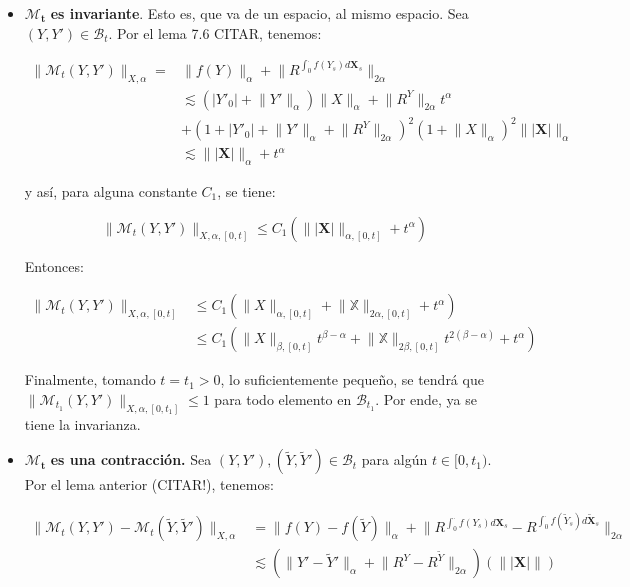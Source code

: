 \begin{itemize}
	\item $\mathbf{ \mathcal{M}_t }$ \textbf{es invariante}. Esto es, que va de un espacio, al mismo espacio. Sea $(Y, Y') \in \mathcal{B}_t$. Por el lema 7.6 CITAR, tenemos:

	\begin{align*}
		\lVert \mathcal{M}_t (Y, Y') \rVert_{X, \alpha} =& \lVert f(Y) \rVert_{\alpha} + \lVert R^{\int_0^{\cdot} f(Y_s) d\mathbf{X}_s }  \rVert_{2\alpha} \\
		&\lesssim ( \lvert Y'_0 \rvert + \lVert Y' \rVert_{\alpha}  )\lVert X \rVert_{\alpha} + \lVert R^Y \rVert_{2\alpha} t^{\alpha} \\
		&+ (1 + \lvert Y'_0 \rvert + \lVert Y' \rVert_{\alpha} + 
		 \lVert  R^Y \rVert_{2\alpha})^{2} (1 + \lVert X \rVert_{\alpha})^2 \lVert \lvert \mathbf{X} \rvert \rVert_{\alpha} \\
		&\lesssim  \lVert \lvert \mathbf{X} \rvert \rVert_{\alpha} + t^{\alpha}
	\end{align*}

	y así, para alguna constante $C_1$, se tiene:

	\[
		\lVert \mathcal{M}_t (Y,Y') \rVert_{ X, \alpha, [0,t] } \leq C_1 \left(  \lVert  \lvert \mathbf{X} \rvert  \rVert_{\alpha, [0,t]} + t^{\alpha} \right)
	\]

	Entonces:

	\begin{align*}
		\lVert \mathcal{M}_t (Y,Y') \rVert_{X, \alpha, [0,t]} &\leq  C_1 ( \lVert X \rVert_{\alpha, [0,t]} + \lVert \mathbb{X} \rVert_{2\alpha, [0,t]} + t^{\alpha} ) \\
		&\leq C_1 ( \lVert X \rVert_{\beta, [0,t]} t^{\beta - \alpha} + \lVert \mathbb{X} \rVert_{2 \beta, [0,t]} t^{2 (\beta - \alpha)} + t^{\alpha} )
	\end{align*}

	Finalmente, tomando $t = t_1 > 0$, lo suficientemente pequeño, se tendrá que $\lVert \mathcal{M}_{t_1} (Y, Y') \rVert_{X, \alpha, [0, t_1]} \leq 1$ para todo elemento en $\mathcal{B}_{t_1}$. Por ende, ya se tiene la invarianza.


	\item $\mathbf{\mathcal{M}_t}$ \textbf{es una contracción.} Sea $(Y, Y'), ( \tilde{Y}, \tilde{Y}' ) \in \mathcal{B}_{t}$ para algún $t \in [0,t_1)$. Por el lema anterior (CITAR!), tenemos:

	\begin{align*}
		\lVert  \mathcal{M}_t (Y, Y') - \mathcal{M}_t (\tilde{Y}, \tilde{Y}') \rVert_{X, \alpha} &=  \lVert f(Y) - f(\tilde{Y}) \rVert_{\alpha} + \lVert R^{\int_0^{\cdot} f(Y_s) d\mathbf{X}_s} - R^{\int_0^{\cdot} f( \tilde{Y}_s ) d \mathbf{ \tilde{X} }_s }  \rVert_{2 \alpha} \\
		&\lesssim ( \lVert Y' - \tilde{Y}' \rVert_{\alpha} + \lVert R^Y - R^{\tilde{Y}} \rVert_{2\alpha} )( \lVert \lvert \mathbf{X} \rvert \rVert  )
	\end{align*}

\end{itemize}




